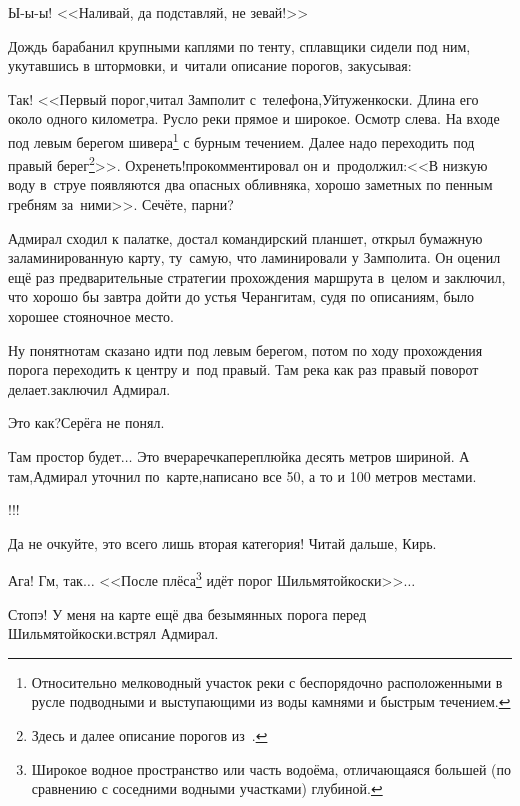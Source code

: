 \diagdash Ы-ы-ы! <<Наливай, да подставляй, не зевай!>>

Дождь барабанил крупными каплями по тенту, сплавщики сидели под ним, укутавшись в штормовки, и~читали описание порогов, закусывая:

\renewcommand*{\thefootnote}{\arabic{footnote}}
\setcounter{footnote}{0}
\diagdash Так! <<Первый порог,\mdash читал Замполит с~телефона,\mdash Уйтуженкоски. Длина его около одного километра. Русло реки прямое и широкое. Осмотр слева. На входе под левым берегом шивера\footnote{Относительно мелководный участок реки с беспорядочно расположенными в русле подводными и выступающими из воды камнями и быстрым течением.} с бурным течением. Далее надо переходить под правый берег\footnote{Здесь и далее описание порогов из~\cite{Шилов}.}>>. Охренеть!\mdash прокомментировал он и~продолжил:\mdash <<В низкую воду в~струе появляются два опасных обливняка, хорошо заметных по пенным гребням за~ними>>. Сечёте, парни?

Адмирал сходил к палатке, достал командирский планшет, открыл бумажную заламинированную карту, ту~самую, что ламинировали у Замполита. Он оценил ещё раз предварительные стратегии прохождения маршрута в~целом и заключил, что хорошо бы завтра дойти до устья Черанги\mdash там, судя по описаниям, было хорошее стояночное место.

\diagdash Ну понятно\mdash там сказано идти под левым берегом, потом по ходу прохождения порога переходить к центру и~под правый. Там река как раз правый поворот делает.\mdash заключил Адмирал.

\diagdash Это как?\mdash Серёга не понял.

\diagdash Там простор будет$\ldots$ Это вчера\mdash речка\sdash переплюйка десять метров шириной. А там,\mdash Адмирал уточнил по~карте,\mdash написано все 50, а то и 100 метров местами.

\diagdash !!!

\diagdash Да не очкуйте, это всего лишь вторая категория! Читай дальше, Кирь.

\renewcommand*{\thefootnote}{\fnsymbol{footnote}}
\setcounter{footnote}{0}
\diagdash Ага! Гм, так$\ldots$ <<После плёса\footnote{Широкое водное пространство или часть водоёма, отличающаяся большей (по сравнению с соседними водными участками) глубиной.} идёт порог Шильмятойкоски>>$\ldots$

\diagdash Стопэ! У меня на карте ещё два безымянных порога перед Шильмятойкоски.\mdash встрял Адмирал.

